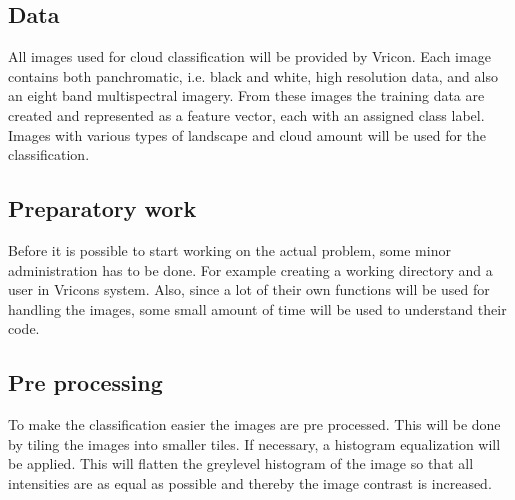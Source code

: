 \documentclass{article}
\begin{document}
\subsection{Data}
All images used for cloud classification will be provided by Vricon. Each image contains both panchromatic, i.e. black and white, high resolution data, and also an eight band multispectral imagery. From these images the training data are created and represented as a feature vector, each with an assigned class label. Images with various types of landscape and cloud amount will be used for the classification.

\subsection{Preparatory work}
Before it is possible to start working on the actual problem, some minor administration has to be done. For example creating a working directory and a user in Vricons system. Also, since a lot of their own functions will be used for handling the images, some small amount of time will be used to understand their code.

\subsection{Pre processing}
To make the classification easier the images are pre processed. This will be done by tiling the images into smaller tiles. If necessary, a histogram equalization will be applied. This will flatten the greylevel histogram of the image so that all intensities are as equal as possible and thereby the image contrast is increased.


\end{document}
